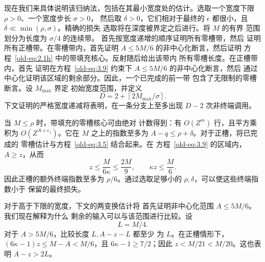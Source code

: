 \documentclass[11pt,a4paper]{article}
\numberwithin{equation}{section}
\numberwithin{figure}{section}
\theoremstyle{definition}
\theoremstyle{remark}
\begin{document}
现在我们来具体说明该归纳法，包括在其最小宽度处的估计。选取一个宽度下限 \(\rho>0\)、一个宽度步长 \(\sigma>0\)，
然后取 \(\delta>0\)，它们相对于最终的
\(\epsilon\) 都很小，且 \(\delta\ll\min(\rho,\sigma)\)。精确的损失
选取将在深度被界定之后进行。将 \(M\) 的有界
范围划分为长度为 \(\sigma/4\) 的连续带。
首先按宽度递增的顺序证明所有零槽带，然后
证明所有正槽带。在零槽带内，首先证明
\(A\le5M/6\) 的非中心化断言，然后证明
方程~\eqref{old-eq:2.1h} 中的带填充核心。反射随后给出该带内
所有零槽长度。在正槽带内，首先
证明在方程~\eqref{old-eq:3.9} 约束下
\(A\le5M/6\) 的非中心化断言，然后
通过中心化证明该区域的剩余部分。因此，一个已完成的前一带
包含了无限制的零槽断言。设 \(M_{\max}\) 界定
初始宽度范围，并定义
\[
 D=2+\left\lceil 2M_{\max}/\sigma\right\rceil.
\]
下文证明的严格宽度递减将表明，在一条分支上至多出现 \(D-2\)
次非终端调用。

当 \(M\le\rho\) 时，带填充的零槽核心可由绝对
计数得到：有 \(O(Z^m)\) 行，且平方乘积为
\(O(Z^{A+\epsilon_1})\)。它在 \(M\) 之上的指数至多为
\(A-q\le\rho+\delta\)。对于正槽，将已完成的
零槽估计与方程~\eqref{old-eq:3.5} 结合起来。在
方程~\eqref{old-eq:3.9} 的区域内，\(A\ge z\)，从而
\begin{equation}
 z\le\frac{M}{6\kappa}\le\frac{2M}{9},
 \qquad \kappa z\le\frac M6.
 \label{old-eq:3.6}
\end{equation}
因此正槽的额外终端指数至多为
\(\rho/6\)。通过选取足够小的 \(\rho,\delta\)，可以使这些终端指数小于
保留的最终损失。

对于高于下限的宽度，下文的两变换估计将
首先证明非中心化范围 \(A\le5M/6\)。我们现在解释为什么
剩余的输入可以与该范围进行比较。设
\begin{equation}
 L=M/4.
 \label{old-eq:2.2}
\end{equation}
对于 \(A>5M/6\)，比较长度 \(L,A-z-L\) 都至少
为 \(L\)。在正槽情形下，
\((6\kappa-1)z\le M-A<M/6\)，且 \(6\kappa-1\ge7/2\)；因此
\(z<M/21<M/20\)。这也表明 \(A-z>2L\)。
\end{document}
